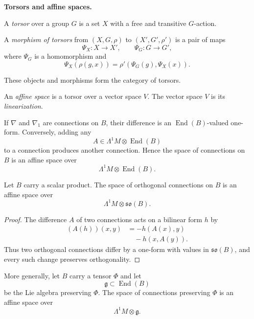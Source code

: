 \medskip\noindent
{\bf Torsors and affine spaces.}

\begin{definition}
\label{definition-torsor}
A {\it torsor} over a group $G$ is a set
$X$ with a free and transitive $G$-action.
\end{definition}

\begin{definition}
\label{definition-torsor-morphism}
A {\it morphism of torsors} from
$(X,G,\rho)$ to $(X',G',\rho')$ is a pair
of maps
$$
\Psi_X:X\longrightarrow X',
\qquad
\Psi_G:G\longrightarrow G',
$$
where $\Psi_G$ is a homomorphism and
$$
\Psi_X(\rho(g,x))
=\rho'(\Psi_G(g),\Psi_X(x)).
$$
\end{definition}

These objects and morphisms form the
category of torsors.

\begin{definition}
\label{definition-affine-space}
An {\it affine space} is a torsor over a
vector space $V$. The vector space $V$ is
its {\it linearization}.
\end{definition}

If $\nabla$ and $\nabla_1$ are connections
on $B$, their difference is an
$\operatorname{End}(B)$-valued one-form.
Conversely, adding any
$$
A\in\Lambda^1M\otimes
\operatorname{End}(B)
$$
to a connection produces another
connection. Hence the space of connections
on $B$ is an affine space over
$$
\Lambda^1M\otimes\operatorname{End}(B).
$$

\begin{proposition}
\label{proposition-affine-orthogonal}
Let $B$ carry a scalar product. The space of
orthogonal connections on $B$ is an affine
space over
$$
\Lambda^1M\otimes\mathfrak{so}(B).
$$
\end{proposition}

\begin{proof}
The difference $A$ of two connections acts
on a bilinear form $h$ by
$$
\begin{aligned}
(A(h))(x,y)
&=-h(A(x),y)\\
&\quad-h(x,A(y)).
\end{aligned}
$$
Thus two orthogonal connections differ by a
one-form with values in
$\mathfrak{so}(B)$, and every such change
preserves orthogonality.
\end{proof}

More generally, let $B$ carry a tensor
$\Phi$ and let
$$
\mathfrak{g}\subset\operatorname{End}(B)
$$
be the Lie algebra preserving $\Phi$. The
space of connections preserving $\Phi$ is
an affine space over
$$
\Lambda^1M\otimes\mathfrak{g}.
$$


